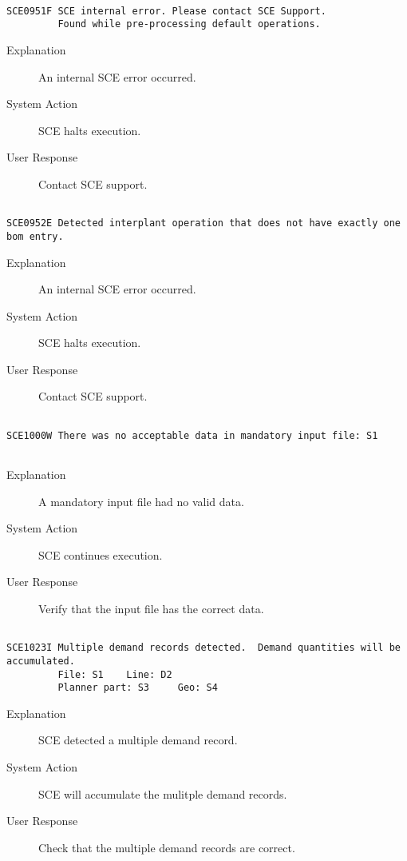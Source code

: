 \hrulefill
\begin{verbatim}

SCE0951F SCE internal error. Please contact SCE Support.
         Found while pre-processing default operations.
\end{verbatim}
\begin{description}
\item[Explanation]  An internal SCE error occurred. 

\item[System Action]  SCE halts execution.

\item[User Response]  Contact SCE support.
\end{description}
\hrulefill
\begin{verbatim}

SCE0952E Detected interplant operation that does not have exactly one bom entry.
\end{verbatim}
\begin{description}
\item[Explanation]  An internal SCE error occurred.

\item[System Action]  SCE halts execution.

\item[User Response]  Contact SCE support.
\end{description}
\hrulefill
\begin{verbatim}

SCE1000W There was no acceptable data in mandatory input file: S1
         
\end{verbatim}
\begin{description}
\item[Explanation]  A mandatory input file had no valid data.

\item[System Action]  SCE continues execution.

\item[User Response]  Verify that the input file has the correct data.
\end{description}
\hrulefill
\begin{verbatim}

SCE1023I Multiple demand records detected.  Demand quantities will be accumulated.
         File: S1    Line: D2
         Planner part: S3     Geo: S4
\end{verbatim}
\begin{description}
\item[Explanation]  SCE detected a multiple demand record.

\item[System Action]  SCE will accumulate the mulitple demand records.

\item[User Response]  Check that the multiple demand records are correct.
\end{description}
